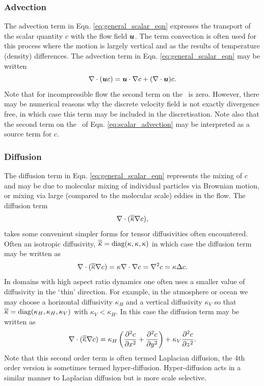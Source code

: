 \subsubsection{Advection}
The advection term in Eqn. \ref{eq:general_scalar_eqn} expresses the transport of the scalar quantity $c$ with the flow field $\bmu$. The term convection is often used for this process where the motion is largely vertical and as the results of temperature (density) differences.
The advection term in Eqn. \ref{eq:general_scalar_eqn} may be written
\begin{equation}\label{eq:scalar_advection}
\nabla\cdot(\bmu c) = \bmu\cdot\nabla c + (\nabla\cdot\bmu)c.
\end{equation}
Note that for incompressible flow the second term on the \rhs\ is zero. However, there may be numerical reasons why the discrete velocity field is not exactly divergence free, in which case this term may be included in the discretisation. Note also that the second term on the \rhs\ of Eqn. \ref{eq:scalar_advection} may be interpreted as a source term for $c$.

\subsubsection{Diffusion}
The diffusion term in Eqn. \ref{eq:general_scalar_eqn} represents the mixing of $c$ and may be due to molecular mixing of individual particles via Brownian motion, or mixing via large (compared to the molecular scale) eddies in the flow.  The diffusion term
\begin{equation}\label{eq:scalar_diffusion}
\nabla\cdot(\kaptens\nabla c),
\end{equation}
takes some convenient simpler forms for tensor diffusivities often encountered. Often an isotropic diffusivity, $\kaptens = \mathrm{diag}(\kappa,\kappa,\kappa)$ in which case the diffusion term may be written as
\begin{equation}\label{eq:scalar_isotropic_diffusion}
\nabla\cdot(\kaptens\nabla c) = \kappa\nabla\cdot\nabla c = \nabla^2 c = \kappa\Delta c.
\end{equation}
In domains with high aspect ratio dynamics one often uses a smaller value of diffusivity in the $\lq$thin' direction. For example, in the atmosphere or ocean we may choose a horizontal diffusivity $\kappa_H$ and a vertical diffusivity $\kappa_V$ so that $\kaptens = \mathrm{diag}(\kappa_H,\kappa_H,\kappa_V)$ with $\kappa_V < \kappa_H$.  In this case the diffusion term may be written as
\begin{equation}\label{eq:scalar_isotropic_diffusion}
\nabla\cdot(\kaptens\nabla c) = \kappa_H \left(\pptt[x]{c} + \pptt[y]{c}\right) + \kappa_V \pptt[z]{c}.
\end{equation}
Note that this second order term is often termed Laplacian diffusion, the 4th order version is sometimes termed hyper-diffusion. Hyper-diffusion acts in a similar manner to Laplacian diffusion but is more
scale selective.

